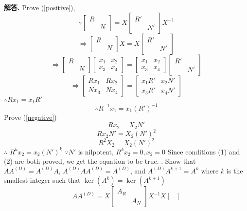 \documentclass[12pt, a4paper, oneside]{article}
\newenvironment{solution}{\par\noindent\textbf{解答. }}{\par}
\begin{document}
\begin{CJK}{UTF8}{gbsn}
\begin{solution}
  Prove (\ref{positive}),
  $$\because \begin{bmatrix}
    R & \\ & N
  \end{bmatrix} = X\begin{bmatrix}
    R' & \\ & N'
  \end{bmatrix}X^{-1}$$
  $$\Rightarrow \begin{bmatrix}
    R & \\ & N
  \end{bmatrix}X = X\begin{bmatrix}
    R' & \\ & N'
  \end{bmatrix}$$ 
  $$ \Rightarrow \begin{bmatrix}
    R & \\ & N
  \end{bmatrix} \begin{bmatrix}
    x_1 & x_2 \\ x_3 & x_4
  \end{bmatrix} = \begin{bmatrix}
    x_1 & x_2 \\ x_3 & x_4
  \end{bmatrix} \begin{bmatrix}
    R' & \\ & N'
  \end{bmatrix} $$ 
  $$ \Rightarrow\begin{bmatrix}
    Rx_1 & Rx_2 \\ Nx_3 & Nx_4
  \end{bmatrix} = \begin{bmatrix}
    x_1R' & x_2N' \\ x_3R' & x_4N'
  \end{bmatrix}$$ 
  $\therefore Rx_1 = x_1R'$
  $$\therefore R^{-1}x_1 = x_1(R')^{-1}$$
  Prove (\ref{negative})
  $$Rx_2 = X_2N'$$
  $$Rx_2N' = X_2(N')^2$$
  $$R^2X_2 = X_2(N')^2$$
  $\therefore$ $R^kx_2 = x_2(N')^k$
  $\because N'$ is nilpotent, $R^kx_2 = 0, x_2=0$ \newline
  Since conditions (1) and (2) are both proved, we get the equation to be true. . Show that $AA^{(D)} = A^{(D)}A$, $A^{(D)}AA^{(D)} = A^{(D)}$, and $A^{(D)}A^{k+1} = A^k$ where $k$ is the smallest integer 
  such that $\ker{(A^k)} = \ker{(A^{k+1})}$
  $$ AA^{(D)} = X\begin{bmatrix}
    A_R & \\ & A_N 
  \end{bmatrix} X^{-1} X\begin{bmatrix}

\end{bmatrix}$$
\end{solution}
\end{CJK}
\end{document}
